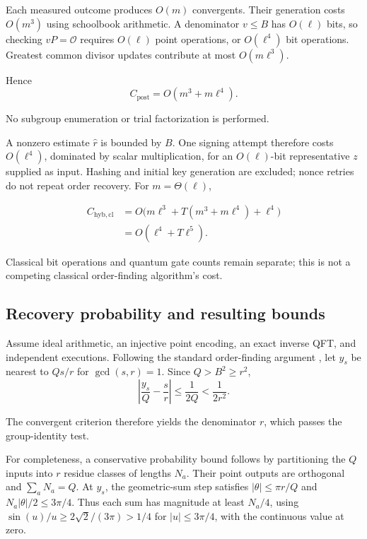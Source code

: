 \begin{revision}
Each measured outcome produces $O(m)$ convergents. Their generation costs $O(m^3)$ using schoolbook arithmetic. A denominator $v\leq B$ has $O(\ell)$ bits, so checking $vP=\mathcal O$ requires $O(\ell)$ point operations, or $O(\ell^4)$ bit operations. Greatest common divisor updates contribute at most $O(m\ell^3)$. 

Hence
\begin{equation}
    \label{eq:app_r6_postprocessing}
    C_{\mathrm{post}}=O(m^3+m\ell^4).
\end{equation}

No subgroup enumeration or trial factorization is performed.

A nonzero estimate $\hat r$ is bounded by $B$. One signing attempt therefore costs $O(\ell^4)$, dominated by scalar multiplication, for an $O(\ell)$-bit representative $z$ supplied as input. Hashing and initial key generation are excluded; nonce retries do not repeat order recovery. For $m=\Theta(\ell)$,

\begin{equation}
    \label{eq:app_r6_classical_total}
    \begin{aligned}
        C_{\mathrm{hyb,cl}}
        &=O\bigl(m\ell^3+T(m^3+m\ell^4)+\ell^4\bigr)\\
        &=O(\ell^4+T\ell^5).
    \end{aligned}
\end{equation}

Classical bit operations and quantum gate counts remain separate; this is not a competing classical order-finding algorithm's cost.

\subsection{Recovery probability and resulting bounds}

Assume ideal arithmetic, an injective point encoding, an exact inverse QFT, and independent executions. Following the standard order-finding argument \cite{Shor1997}, let $y_s$ be nearest to $Qs/r$ for $\gcd(s,r)=1$. Since $Q>B^2\geq r^2$,
\[
    \left|\frac{y_s}{Q}-\frac{s}{r}\right|
    \leq\frac{1}{2Q}<\frac{1}{2r^2}.
\]

The convergent criterion \cite{HardyWright2008} therefore yields the denominator $r$, which passes the group-identity test.

For completeness, a conservative probability bound follows by partitioning the $Q$ inputs into $r$ residue classes of lengths $N_a$. Their point outputs are orthogonal and $\sum_aN_a=Q$. At $y_s$, the geometric-sum step satisfies $|\theta|\leq\pi r/Q$ and $N_a|\theta|/2\leq3\pi/4$. Thus each sum has magnitude at least $N_a/4$, using $\sin(u)/u\geq2\sqrt2/(3\pi)>1/4$ for $|u|\leq3\pi/4$, with the continuous value at zero. 


\end{revision}
